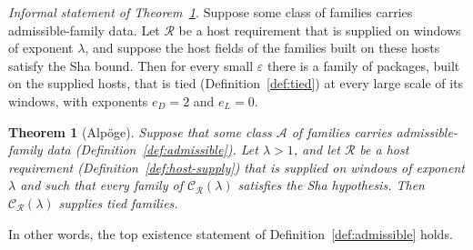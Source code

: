 \documentclass[11pt]{amsbook}
\theoremstyle{plain}
\newtheorem{theorem}{Theorem}[section]
\theoremstyle{definition}
\theoremstyle{remark}
\numberwithin{equation}{section}
\numberwithin{figure}{chapter}
\numberwithin{table}{chapter}
\newcommand{\eps}{\varepsilon}
\begin{document}
\noindent \emph{Informal statement of
Theorem~\ref{thm:tied-families}.} Suppose some class of families
carries admissible-family data. Let $\mathscr R$ be a host requirement
that is supplied on windows of exponent $\lambda$, and suppose the
host fields of the families built on these hosts satisfy the Sha
bound. Then for every small $\eps$ there is a family of packages, built
on the supplied hosts, that is tied (Definition~\ref{def:tied}) at
every large scale of its windows, with exponents $e_D=2$ and $e_L=0$.

\begin{theorem}[Alp\"oge]\label{thm:tied-families}
Suppose that some class $\mathcal A$ of families carries
admissible-family data (Definition~\ref{def:admissible}). Let
$\lambda>1$, and let $\mathscr R$ be a host requirement
(Definition~\ref{def:host-supply}) that is supplied on windows of
exponent $\lambda$ and such that every family of
$\mathcal C_{\mathscr R}(\lambda)$ satisfies the Sha hypothesis. Then
$\mathcal C_{\mathscr R}(\lambda)$ supplies tied families.
\end{theorem}

\noindent In other words, the top existence statement of
Definition~\ref{def:admissible} holds.
\end{document}
